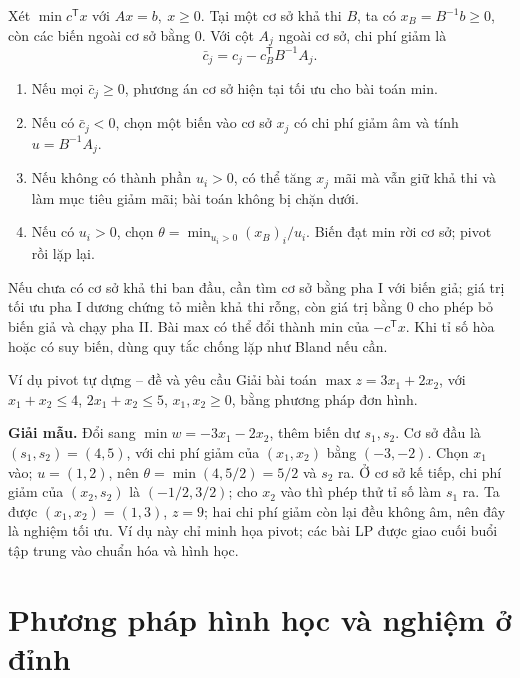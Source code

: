 \documentclass[11pt,a4paper]{article}
\newcommand{\T}{^{\mathsf T}}
\begin{document}
Xét \(\min c\T x\) với \(Ax=b,\ x\ge0\). Tại một cơ sở khả thi \(B\), ta có \(x_B=B^{-1}b\ge0\), còn các biến ngoài cơ sở bằng \(0\). Với cột \(A_j\) ngoài cơ sở, chi phí giảm là
\[
\bar c_j=c_j-c_B\T B^{-1}A_j.
\]
\begin{enumerate}
\item Nếu mọi \(\bar c_j\ge0\), phương án cơ sở hiện tại tối ưu cho bài toán min.
\item Nếu có \(\bar c_j<0\), chọn một biến vào cơ sở \(x_j\) có chi phí giảm âm và tính \(u=B^{-1}A_j\).
\item Nếu không có thành phần \(u_i>0\), có thể tăng \(x_j\) mãi mà vẫn giữ khả thi và làm mục tiêu giảm mãi; bài toán không bị chặn dưới.
\item Nếu có \(u_i>0\), chọn \(\theta=\min_{u_i>0}(x_B)_i/u_i\). Biến đạt min rời cơ sở; pivot rồi lặp lại.
\end{enumerate}
Nếu chưa có cơ sở khả thi ban đầu, cần tìm cơ sở bằng pha I với biến giả; giá trị tối ưu pha I dương chứng tỏ miền khả thi rỗng, còn giá trị bằng \(0\) cho phép bỏ biến giả và chạy pha II. Bài max có thể đổi thành min của \(-c\T x\). Khi tỉ số hòa hoặc có suy biến, dùng quy tắc chống lặp như Bland nếu cần.

\begin{questionbox}{Ví dụ pivot tự dựng -- đề và yêu cầu}
Giải bài toán \(\max z=3x_1+2x_2\), với \(x_1+x_2\le4\), \(2x_1+x_2\le5\), \(x_1,x_2\ge0\), bằng phương pháp đơn hình.
\end{questionbox}
\textbf{Giải mẫu.} Đổi sang \(\min w=-3x_1-2x_2\), thêm biến dư \(s_1,s_2\). Cơ sở đầu là \((s_1,s_2)=(4,5)\), với chi phí giảm của \((x_1,x_2)\) bằng \((-3,-2)\). Chọn \(x_1\) vào; \(u=(1,2)\), nên \(\theta=\min(4,5/2)=5/2\) và \(s_2\) ra. Ở cơ sở kế tiếp, chi phí giảm của \((x_2,s_2)\) là \((-1/2,3/2)\); cho \(x_2\) vào thì phép thử tỉ số làm \(s_1\) ra. Ta được \((x_1,x_2)=(1,3)\), \(z=9\); hai chi phí giảm còn lại đều không âm, nên đây là nghiệm tối ưu. Ví dụ này chỉ minh họa pivot; các bài LP được giao cuối buổi tập trung vào chuẩn hóa và hình học.

\section{Phương pháp hình học và nghiệm ở đỉnh}
\end{document}
